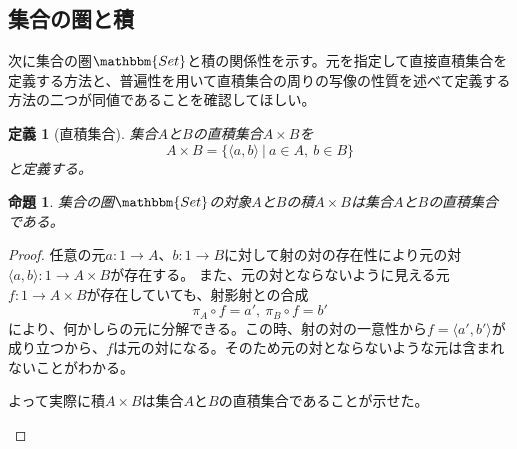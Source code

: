 \documentclass[dvipdfmx]{jsarticle}
\newcommand{\cat}[1]{\mathbbm{#1}}
\newcommand{\arrow}{\rightarrow}
\newcommand{\tuple}[1]{\langle #1\rangle}
\newcommand{\mor}[3]{#1:#2\arrow #3}
\newtheorem{proof}{証明}[section]
\newtheorem{prop}{命題}[section]
\newtheorem{define}{定義}[section]
\numberwithin{proof}{subsection}
\numberwithin{prop}{subsection}
\numberwithin{define}{subsection}
\begin{document}
	\subsection{集合の圏と積}
	次に集合の圏$\cat{Set}$と積の関係性を示す。元を指定して直接直積集合を定義する方法と、普遍性を用いて直積集合の周りの写像の性質を述べて定義する方法の二つが同値であることを確認してほしい。
	\begin{define}[直積集合]
		集合$A$と$B$の直積集合$A\times B$を\[A\times B =\{\tuple{a,b}\ |\ a\in A,\ b\in B\}\]と定義する。
	\end{define}
	\begin{prop}
		集合の圏$\cat{Set}$の対象$A$と$B$の積$A\times B$は集合$A$と$B$の直積集合である。
	\end{prop}
	\begin{proof}
		任意の元$\mor{a}{1}{A}$、$\mor{b}{1}{B}$に対して射の対の存在性により元の対$\mor{\tuple{a,b}}{1}{A\times B}$が存在する。
		また、元の対とならないように見える元$\mor{f}{1}{A\times B}$が存在していても、射影射との合成\[\pi_A\circ f=a',\ \pi_B\circ f=b'\]により、何かしらの元に分解できる。この時、射の対の一意性から$f=\tuple{a',b'}$が成り立つから、$f$は元の対になる。そのため元の対とならないような元は含まれないことがわかる。

		よって実際に積$A\times B$は集合$A$と$B$の直積集合であることが示せた。
		\begin{center}
		\end{center}
	\end{proof}
\end{document}
